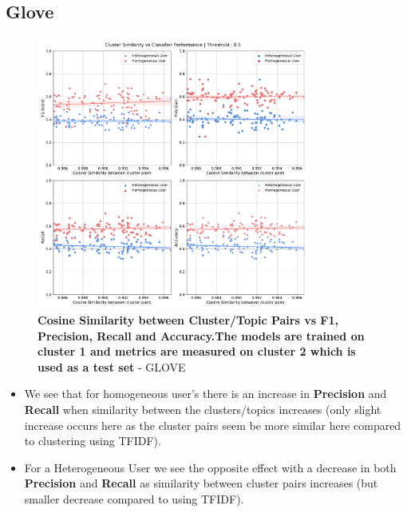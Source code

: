 \documentclass[a4paper,fontsize=8.0pt]{scrartcl}
\begin{document}
\subsection{Glove}
\vspace{-5ex}
\begin{figure}[H]
 \centering
 \includegraphics[width=0.8\textwidth]{Graphs/GLOVE/cluster_sim_vs_model_perf_5.pdf}
 \caption{\textbf{Cosine Similarity between Cluster/Topic Pairs vs F1, Precision, Recall and Accuracy.The models are trained on cluster 1 and metrics are measured on cluster 2 which is used as a test set} - GLOVE}
\end{figure}
\begin{flushleft}
\begin{itemize}
    \item We see that for homogeneous user's there is an increase in \textbf{Precision} and \textbf{Recall} when similarity between the clusters/topics increases (only slight increase occurs here as the cluster pairs seem be more similar here compared to clustering using TFIDF).
    \item For a Heterogeneous User we see the opposite effect with a decrease in both \textbf{Precision} and \textbf{Recall} as similarity between cluster pairs increases (but smaller decrease compared to using TFIDF).
\end{itemize}
\end{flushleft}
\end{document}
